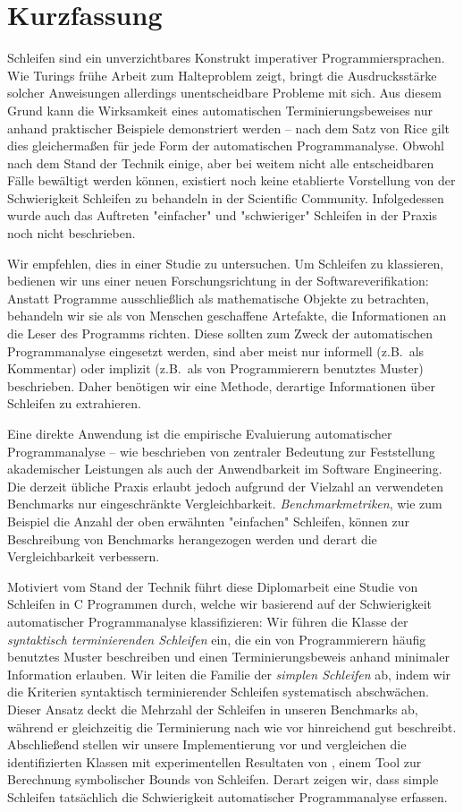 \chapter*{Kurzfassung}

Schleifen sind ein unverzichtbares Konstrukt imperativer Programmiersprachen. Wie Turings frühe Arbeit zum Halteproblem zeigt, bringt die Ausdrucksstärke solcher Anweisungen allerdings unentscheidbare Probleme mit sich. Aus diesem Grund kann die Wirksamkeit eines automatischen Terminierungsbeweises nur anhand praktischer Beispiele demonstriert werden -- nach dem Satz von Rice gilt dies gleichermaßen für jede Form der automatischen Programmanalyse. Obwohl nach dem Stand der Technik einige, aber bei weitem nicht alle entscheidbaren Fälle bewältigt werden können, existiert noch keine etablierte Vorstellung von der Schwierigkeit Schleifen zu behandeln in der Scientific Community. Infolgedessen wurde auch das Auftreten "einfacher" und "schwieriger" Schleifen in der Praxis noch nicht beschrieben.

Wir empfehlen, dies in einer Studie zu untersuchen. Um Schleifen zu klassieren, bedienen wir uns einer neuen Forschungsrichtung in der Softwareverifikation: Anstatt Programme ausschließlich als mathematische Objekte zu betrachten, behandeln wir sie als von Menschen geschaffene Artefakte, die Informationen an die Leser des Programms richten. Diese sollten zum Zweck der automatischen Programmanalyse eingesetzt werden, sind aber meist nur informell (z.B.\ als Kommentar) oder implizit (z.B.\ als von Programmierern benutztes Muster) beschrieben. Daher benötigen wir eine Methode, derartige Informationen über Schleifen zu extrahieren.

Eine direkte Anwendung ist die empirische Evaluierung automatischer Programmanalyse -- wie beschrieben von zentraler Bedeutung zur Feststellung akademischer Leistungen als auch der Anwendbarkeit im Software Engineering. Die derzeit übliche Praxis erlaubt jedoch aufgrund der Vielzahl an verwendeten Benchmarks nur eingeschränkte Vergleichbarkeit. \emph{Benchmarkmetriken}, wie zum Beispiel die Anzahl der oben erwähnten "einfachen" Schleifen, können zur Beschreibung von Benchmarks herangezogen werden und derart die Vergleichbarkeit verbessern.

Motiviert vom Stand der Technik führt diese Diplomarbeit eine Studie von Schleifen in C Programmen durch, welche wir basierend auf der Schwierigkeit automatischer Programmanalyse klassifizieren: Wir führen die Klasse der \emph{syntaktisch terminierenden Schleifen} ein, die ein von Programmierern häufig benutztes Muster beschreiben und einen Terminierungsbeweis anhand minimaler Information erlauben. Wir leiten die Familie der \emph{simplen Schleifen} ab, indem wir die Kriterien syntaktisch terminierender Schleifen systematisch abschwächen. Dieser Ansatz deckt die Mehrzahl der Schleifen in unseren Benchmarks ab, während er gleichzeitig die Terminierung nach wie vor hinreichend gut beschreibt. Abschließend stellen wir unsere Implementierung \sloopy{} vor und vergleichen die identifizierten Klassen mit experimentellen Resultaten von \loopus{}, einem Tool zur Berechnung symbolischer Bounds von Schleifen. Derart zeigen wir, dass simple Schleifen tatsächlich die Schwierigkeit automatischer Programmanalyse erfassen.
